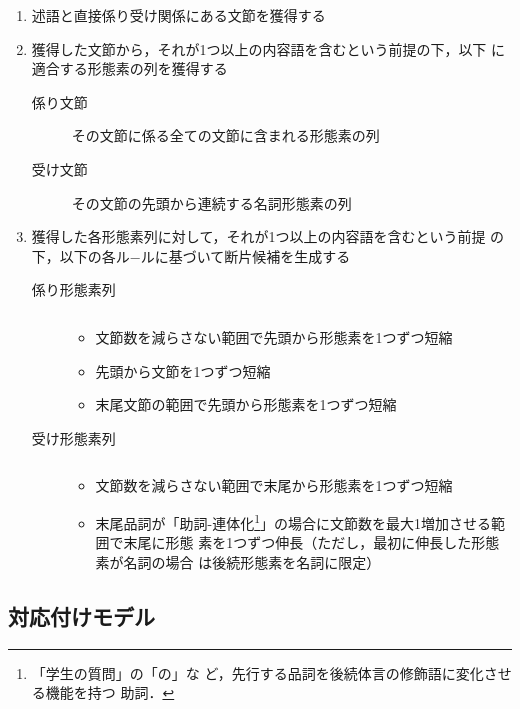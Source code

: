\documentclass[japanese]{jnlp_1.2b}
\begin{document}
\begin{enumerate}
 \item 述語と直接係り受け関係にある文節を獲得する
       \label{enum:extend_rule1_proposal}
 \item 獲得した文節から，それが1つ以上の内容語を含むという前提の下，以下
       に適合する形態素の列を獲得する\label{enum:extend_rule2_proposal}
       \begin{description}
	\item[係り文節] その文節に係る全ての文節に含まれる形態素の列
	\item[受け文節] その文節の先頭から連続する名詞形態素の列
       \end{description}
 \item 獲得した各形態素列に対して，それが1つ以上の内容語を含むという前提
       の下，以下の各ル−ルに基づいて断片候補を生成する
       \label{enum:extend_rule3_proposal}
       \begin{description}
	\item[係り形態素列] $\;$\\\vspace*{-6mm}
	\begin{itemize}
	 \item 文節数を減らさない範囲で先頭から形態素を1つずつ短縮
	 \item 先頭から文節を1つずつ短縮
	 \item 末尾文節の範囲で先頭から形態素を1つずつ短縮
	\end{itemize}
	\item[受け形態素列] $\;$\\\vspace*{-6mm}
        \begin{itemize}
	 \item 文節数を減らさない範囲で末尾から形態素を1つずつ短縮
	 \item 末尾品詞が「助詞-連体化\footnote{「学生の質問」の「の」な
	       ど，先行する品詞を後続体言の修飾語に変化させる機能を持つ
	       助詞．}」の場合に文節数を最大1増加させる範囲で末尾に形態
	       素を1つずつ伸長（ただし，最初に伸長した形態素が名詞の場合
	       は後続形態素を名詞に限定）
	\end{itemize}
       \end{description}
\end{enumerate}




\subsection{対応付けモデル}
\end{document}
